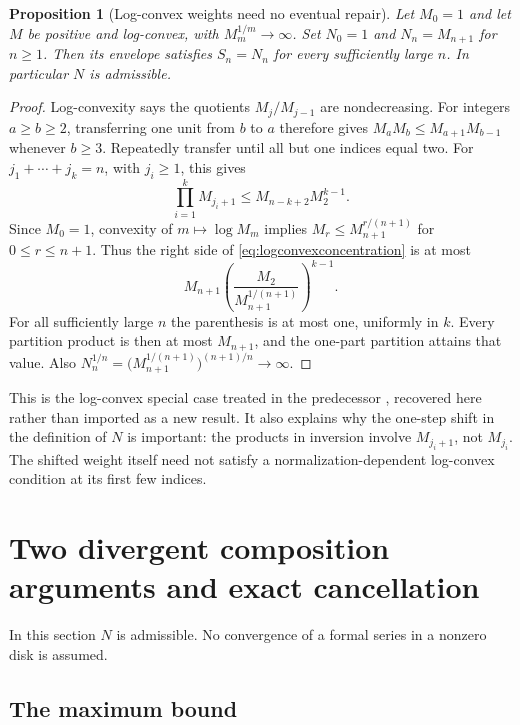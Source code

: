\documentclass[11pt,a4paper]{article}
\numberwithin{equation}{section}
\newtheorem{proposition}[theorem]{Proposition}
\theoremstyle{definition}
\theoremstyle{remark}
\begin{document}
\begin{proposition}[Log-convex weights need no eventual repair]
\label{prop:logconvex}
Let $M_0=1$ and let $M$ be positive and log-convex, with
$M_m^{1/m}\to\infty$. Set $N_0=1$ and $N_n=M_{n+1}$ for $n\ge1$.
Then its envelope satisfies $S_n=N_n$ for every sufficiently large $n$.
In particular $N$ is admissible.
\end{proposition}
\begin{proof}
Log-convexity says the quotients $M_j/M_{j-1}$ are nondecreasing.
For integers $a\ge b\ge2$, transferring one unit from $b$ to $a$
therefore gives
$M_aM_b\le M_{a+1}M_{b-1}$ whenever $b\ge3$.
Repeatedly transfer until all but one indices equal two. For
$j_1+\cdots+j_k=n$, with $j_i\ge1$, this gives
\begin{equation}
 \prod_{i=1}^kM_{j_i+1}\le M_{n-k+2}M_2^{k-1}.
 \label{eq:logconvexconcentration}
\end{equation}
Since $M_0=1$, convexity of $m\mapsto\log M_m$ implies
$M_r\le M_{n+1}^{r/(n+1)}$ for $0\le r\le n+1$. Thus the
right side of \eqref{eq:logconvexconcentration} is at most
\[
 M_{n+1}
 \left(\frac{M_2}{M_{n+1}^{1/(n+1)}}\right)^{k-1}.
\]
For all sufficiently large $n$ the parenthesis is at most one,
uniformly in $k$. Every partition product is then at most $M_{n+1}$,
and the one-part partition attains that value. Also
$N_n^{1/n}=\bigl(M_{n+1}^{1/(n+1)}\bigr)^{(n+1)/n}\to\infty$.
\end{proof}

This is the log-convex special case treated in the predecessor
\cite{repo-weight}, recovered here rather than imported as a new result.
It also explains why the one-step shift in the definition of $N$ is
important: the products in inversion involve $M_{j_i+1}$, not $M_{j_i}$.
The shifted weight itself need not satisfy a normalization-dependent
log-convex condition at its first few indices.

\section{Two divergent composition arguments and exact cancellation}
\label{sec:composition}

In this section $N$ is admissible. No convergence of a formal series in
a nonzero disk is assumed.

\subsection{The maximum bound}
\end{document}
